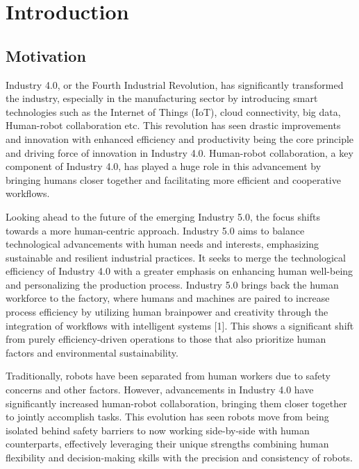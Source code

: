 \chapter{Introduction}
\label{aufbau}

\section{Motivation}
\label{hinweise:titelblatt}
Industry 4.0, or the Fourth Industrial Revolution, has significantly transformed the industry, 
especially in the manufacturing sector by introducing smart technologies such as the Internet of Things (IoT), cloud connectivity, big data, Human-robot collaboration etc. 
This revolution has seen drastic improvements and innovation 
with enhanced efficiency and productivity being the core principle and driving force of innovation in Industry 4.0. Human-robot collaboration, 
a key component of Industry 4.0, has played a huge role in this advancement 
by bringing humans closer together and facilitating more efficient and cooperative workflows.  


Looking ahead to the future of the emerging Industry 5.0, the focus shifts 
towards a more human-centric approach. Industry 5.0 aims to balance technological 
advancements with human needs and interests, emphasizing sustainable and resilient
industrial practices. It seeks to merge the technological efficiency of Industry 
4.0 with a greater emphasis on enhancing human well-being and personalizing the
production process. Industry 5.0 brings back the human workforce to the factory,
where humans and machines are paired to increase process efficiency by utilizing 
human brainpower and creativity through the integration of workflows with intelligent systems \parencite{hum1}[1]. This shows a significant shift from purely efficiency-driven operations to those that also prioritize human factors and environmental sustainability. 


Traditionally, robots have been separated from human 
workers due to safety concerns and other factors.
 However, advancements in Industry 4.0 have significantly increased human-robot collaboration, bringing them closer together to jointly accomplish tasks. This evolution has seen robots move from being isolated behind safety barriers to now working side-by-side with human counterparts, effectively leveraging their unique strengths combining human flexibility and decision-making skills with the precision and consistency of robots.  


